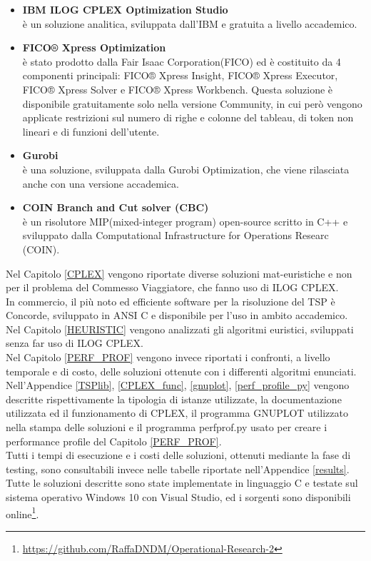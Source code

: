 \begin{itemize}
\item{\textbf{IBM ILOG CPLEX Optimization Studio}\cite{ILOG}\\
è un soluzione analitica, sviluppata dall'IBM e gratuita a livello accademico.}
\item{\textbf{FICO® Xpress Optimization}\cite{FICO}\\
è stato prodotto dalla Fair Isaac Corporation(FICO) ed è costituito da 4 componenti principali: FICO® Xpress Insight, FICO® Xpress Executor, FICO® Xpress Solver e FICO® Xpress Workbench. Questa soluzione è disponibile gratuitamente solo nella versione Community, in cui però vengono applicate restrizioni sul numero di righe e colonne del tableau, di token non lineari e di funzioni dell'utente.}
\item{\textbf{Gurobi}\cite{GUROBI}\\
è una soluzione, sviluppata dalla Gurobi Optimization, che viene rilasciata anche con una versione accademica.}
\item{\textbf{COIN Branch and Cut solver (CBC)}\cite{CBC}\\
è un risolutore MIP(mixed-integer program) open-source scritto in C++ e sviluppato dalla Computational Infrastructure for Operations Researc (COIN).}
\end{itemize}
Nel Capitolo \ref{CPLEX} vengono riportate diverse soluzioni mat-euristiche e non per il problema del Commesso Viaggiatore, che fanno uso di ILOG CPLEX.\\
In commercio, il più noto ed efficiente software per la risoluzione del TSP è Concorde, sviluppato in ANSI C e disponibile per l'uso in ambito accademico\cite{concorde}.\\
Nel Capitolo \ref{HEURISTIC} vengono analizzati gli algoritmi euristici, sviluppati senza far uso di ILOG CPLEX.\\
Nel Capitolo \ref{PERF_PROF} vengono invece riportati i confronti, a livello temporale e di costo, delle soluzioni ottenute con i differenti algoritmi enunciati.\\
Nell'Appendice \ref{TSPlib}, \ref{CPLEX_func}, \ref{gnuplot}, \ref{perf_profile_py} vengono descritte rispettivamente la tipologia di istanze utilizzate, la documentazione utilizzata ed il funzionamento di CPLEX, il programma GNUPLOT utilizzato nella stampa delle soluzioni e il programma perfprof.py usato per creare i performance profile del Capitolo \ref{PERF_PROF}.\\
Tutti i tempi di esecuzione e i costi delle soluzioni, ottenuti mediante la fase di testing, sono consultabili invece nelle tabelle riportate nell'Appendice \ref{results}. Tutte le soluzioni descritte sono state implementate in linguaggio C e testate sul sistema operativo Windows 10 con Visual Studio, ed i sorgenti sono disponibili online\footnote{\url{https://github.com/RaffaDNDM/Operational-Research-2}}.